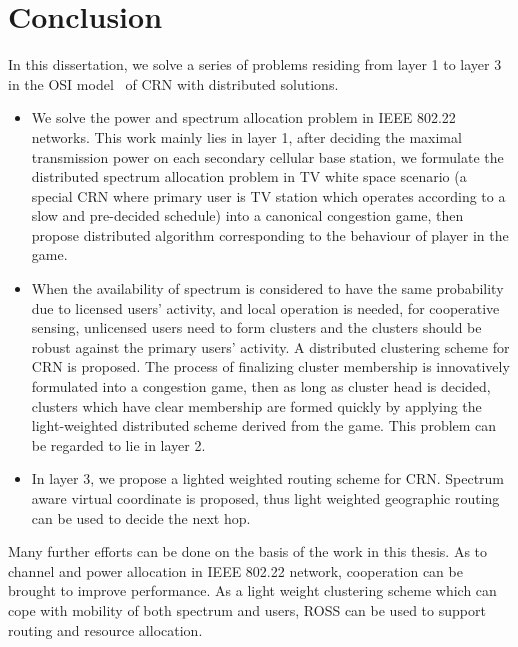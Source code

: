 \chapter{Conclusion}
In this dissertation, we solve a series of problems residing from layer 1 to layer 3 in the OSI model~\cite{osi} of CRN with distributed solutions.
\begin{itemize}
\item We solve the power and spectrum allocation problem in IEEE 802.22 networks.
This work mainly lies in layer 1, after deciding the maximal transmission power on each secondary cellular base station, we formulate the distributed spectrum allocation problem in TV white space scenario (a special CRN where primary user is TV station which operates according to a slow and pre-decided schedule) into a canonical congestion game, then propose distributed algorithm corresponding to the behaviour of player in the game.

\item 
When the availability of spectrum is considered to have the same probability due to licensed users' activity, and local operation is needed, \ie for cooperative sensing, unlicensed users need to form clusters and the clusters should be robust against the primary users' activity.
A distributed clustering scheme for CRN is proposed. 
The process of finalizing cluster membership is innovatively formulated into a congestion game, then as long as cluster head is decided, clusters which have clear membership are formed quickly by applying the  light-weighted distributed scheme derived from the game.
This problem can be regarded to lie in layer 2.

\item In layer 3, we propose a lighted weighted routing scheme for CRN. 
Spectrum aware virtual coordinate is proposed, thus light weighted geographic routing can be used to decide the next hop.
\end{itemize}

Many further efforts can be done on the basis of the work in this thesis.
As to channel and power allocation in IEEE 802.22 network, cooperation can be brought to improve performance. 
As a light weight clustering scheme which can cope with mobility of both spectrum and users, ROSS can be used to support routing and resource allocation.



